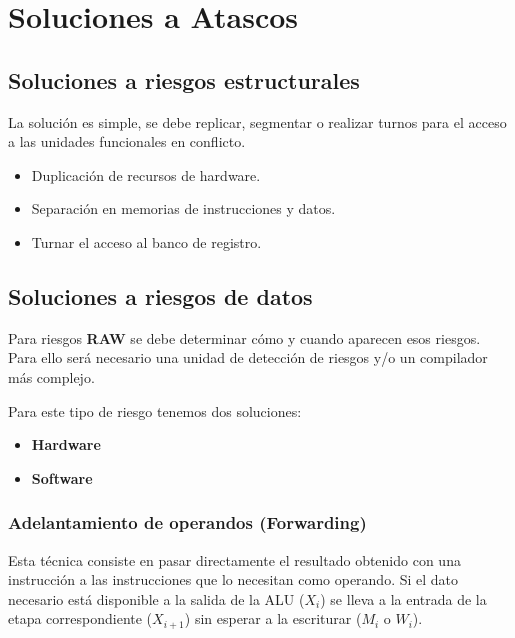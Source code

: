 \section{Soluciones a Atascos}

\subsection{Soluciones a riesgos estructurales}

La solución es simple, se debe replicar, segmentar o realizar turnos para el acceso a las unidades funcionales en conflicto.

\begin{itemize}
  \item Duplicación de recursos de hardware.
  \item Separación en memorias de instrucciones y datos.
  \item Turnar el acceso al banco de registro.
\end{itemize}

\subsection{Soluciones a riesgos de datos}

Para riesgos \textbf{RAW} se debe determinar cómo y cuando aparecen esos riesgos. Para ello será necesario una unidad de detección de riesgos y/o un compilador más complejo.

Para este tipo de riesgo tenemos dos soluciones:

\begin{itemize}
  \item \textbf{Hardware}
  \item \textbf{Software}
\end{itemize}

\subsubsection{Adelantamiento de operandos (Forwarding)}

Esta técnica consiste en pasar directamente el resultado obtenido con una instrucción a las instrucciones que lo necesitan como operando. Si el dato necesario está disponible a la salida de la ALU ($X_i$) se lleva a la entrada de la etapa correspondiente ($X_{i+1}$) sin esperar a la escriturar ($M_i$ o $W_i$).


